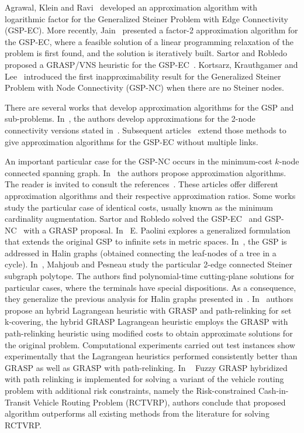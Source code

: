 Agrawal, Klein and Ravi~\cite{32} developed an approximation algorithm with logarithmic factor 
for the Generalized Steiner Problem with Edge Connectivity (GSP-EC). More recently, Jain~\cite{33} presented 
a factor-2 approximation algorithm for the GSP-EC, where a feasible solution of a linear programming relaxation of the problem is first found, and the solution is iteratively built. Sartor and Robledo proposed a 
GRASP/VNS heuristic for the GSP-EC~\cite{26}. Kortsarz, Krauthgamer and Lee~\cite{34} introduced the first inapproximability result for the Generalized Steiner Problem with Node Connectivity (GSP-NC) when there are no Steiner nodes. 

There are several works that develop approximation algorithms for the GSP and sub-problems. 
In~\cite{35}, the authors develop approximations for the 2-node connectivity versions stated in~\cite{37}.  Subsequent articles~\cite{38, 39, 40} extend those methods to give approximation algorithms 
for the GSP-EC without multiple links.

An important particular case for the GSP-NC occurs in the minimum-cost $k$-node connected spanning graph. 
In~\cite{41,42,43} the authors propose approximation algorithms. The reader is invited to consult the 
references~\cite{44,45,46,47}. These articles offer different approximation algorithms and their 
respective approximation ratios. Some works study the particular case of identical costs, usually known as the 
minimum cardinality augmentation. Sartor and Robledo solved the GSP-EC~\cite{62} and GSP-NC~\cite{63,65} with a GRASP proposal. In~\cite{64} E. Paolini explores a generalized formulation that extends the original GSP 
to infinite sets in metric spaces. In~\cite{66}, the GSP is addressed in Halin graphs (obtained connecting the leaf-nodes of a tree in a cycle). In~\cite{30}, Mahjoub and Pesneau study the particular 2-edge connected Steiner subgraph polytope. The authors find polynomial-time cutting-plane solutions for particular cases, where 
the terminals have special dispositions. As a consequence, they generalize the previous analysis for 
Halin graphs presented in~\cite{66}. In~\cite{53} authors propose an hybrid Lagrangean heuristic with GRASP and path-relinking for set k-covering, the hybrid GRASP Lagrangean heuristic employs the GRASP with path-relinking heuristic using modified costs to obtain approximate solutions for the original problem. Computational experiments carried out test instances show experimentally that the Lagrangean heuristics performed consistently better than GRASP as well as GRASP with path-relinking. In ~\cite{58} Fuzzy GRASP hybridized with path relinking is implemented for solving a variant of the vehicle routing problem with additional risk constraints, namely the Risk-constrained Cash-in-Transit Vehicle Routing Problem (RCTVRP), authors conclude that proposed algorithm outperforms all existing methods from the literature for solving RCTVRP.

